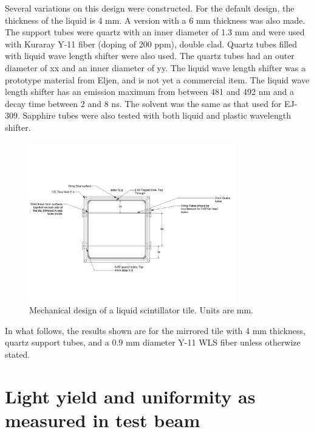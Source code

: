 \documentclass[review]{elsarticle}
\begin{document}
Several variations on this design were constructed.  For the default design, the thickness of the liquid is 4 mm.  A version with a 6 mm thickness was also made.  The support tubes were quartz with an inner diameter of 1.3 mm and were used with Kuraray Y-11 fiber (doping of 200 ppm), double clad.  Quartz tubes filled with liquid wave length shifter were also used.  The quartz tubes had
an outer diameter of xx and an inner diameter of yy.  The liquid wave length shifter was a prototype material from Eljen, and is not yet a commercial item.
The liquid wave length shifter has an emission maximum from between 
481 and 492 nm and a decay time between 2 and 8 ns.  
The solvent was the same as that used for EJ-309.
Sapphire tubes were also tested with both liquid and plastic wavelength shifter.


\begin{figure}[!ht]
\begin{center}
\includegraphics[width=0.8\textwidth]{./figures/mechanicaldesign.pdf}
\caption{
Mechanical design of a liquid scintillator tile.  Units are mm.
}
\label{fig:tiledesign}
\end{center}
\end{figure}

In what follows, the results shown are for the mirrored tile with 4 mm thickness, quartz support tubes, and a 0.9 mm diameter Y-11 WLS fiber unless otherwize stated.

\section{Light yield and uniformity as measured in test beam}
\end{document}
